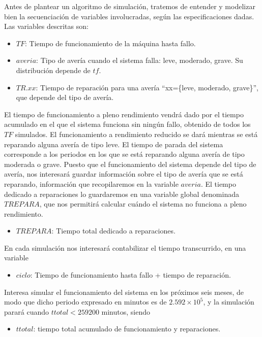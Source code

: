 \documentclass[
]{book}
\providecommand{\tightlist}{%
  \setlength{\itemsep}{0pt}\setlength{\parskip}{0pt}}
\theoremstyle{definition}
\theoremstyle{definition}
\theoremstyle{definition}
\theoremstyle{definition}
\theoremstyle{remark}
\begin{document}
Antes de plantear un algoritmo de simulación, tratemos de entender y modelizar bien la secuenciación de variables involucradas, según las especificaciones dadas. Las variables descritas son:

\begin{itemize}
\tightlist
\item
  \(TF\): Tiempo de funcionamiento de la máquina hasta fallo.
\item
  \(averia\): Tipo de avería cuando el sistema falla: leve, moderado, grave. Su distribución depende de \(tf\).
\item
  \(TR.xx\): Tiempo de reparación para una avería ``xx=\{leve, moderado, grave\}'', que depende del tipo de avería.
\end{itemize}

El tiempo de funcionamiento a pleno rendimiento vendrá dado por el tiempo acumulado en el que el sistema funciona sin ningún fallo, obtenido de todos los \(TF\) simulados. El funcionamiento a rendimiento reducido se dará mientras se está reparando alguna avería de tipo leve. El tiempo de parada del sistema corresponde a los periodos en los que se está reparando alguna avería de tipo moderada o grave. Puesto que el funcionamiento del sistema depende del tipo de avería, nos interesará guardar información sobre el tipo de avería que se está reparando, información que recopilaremos en la variable \(averia\). El tiempo dedicado a reparaciones lo guardaremos en una variable global denominada \(TREPARA\), que nos permitirá calcular cuándo el sistema no funciona a pleno rendimiento.

\begin{itemize}
\tightlist
\item
  \(TREPARA\): Tiempo total dedicado a reparaciones.
\end{itemize}

En cada simulación nos interesará contabilizar el tiempo transcurrido, en una variable

\begin{itemize}
\tightlist
\item
  \(ciclo\): Tiempo de funcionamiento hasta fallo + tiempo de reparación.
\end{itemize}

Interesa simular el funcionamiento del sistema en los próximos seis meses, de modo que dicho periodo expresado en minutos es de \ensuremath{2.592\times 10^{5}}, y la simulación parará cuando \(ttotal<259200\) minutos, siendo

\begin{itemize}
\tightlist
\item
  \(ttotal\): tiempo total acumulado de funcionamiento y reparaciones.
\end{itemize}
\end{document}
